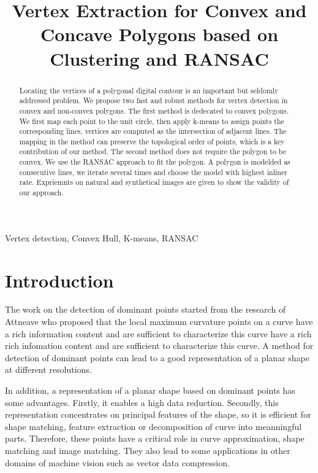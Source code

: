 \documentclass{article}
\title{Vertex Extraction for Convex and Concave Polygons based on Clustering and RANSAC}
\begin{document}
%
\maketitle
%
\begin{abstract}

Locating the vertices of a polygonal digital contour is an important but seldomly addressed problem.
We propose two fast and robust methods for vertex detection in convex and non-convex polygons.
The first method is dedecated to convex polygons. We first map each point to the unit circle, then apply
k-means to assign points the corresponding lines, vertices are computed as the intersection of adjacent lines.
The mapping in the method can preserve the topological order of points, which is a key contribution of our method.
The second method does not require the polygon to be convex. We use the RANSAC approach to fit the polygon. A polygon
is modelded as consecutive lines, we iterate several times and choose the model with highest inliner rate. Expriemnts
on natural and synthetical images are given to show the validity of our approach.

\end{abstract}
%
\begin{keywords}
  Vertex detection, Convex Hull, K-means, RANSAC
\end{keywords}
%
\section{Introduction}
\label{sec:intro}
The work on the detection of dominant points started from the research of Attneave who proposed that the local maximum
curvature points on a curve have a rich information content and are sufficient to characterize this curve have a rich
rich infomation content and are sufficient to characterize this curve. A method for detection of
dominant points can lead to a good representation of a planar shape at different resolutions.

In addition, a representation of a planar shape based on dominant points has some advantages.
Firstly, it enables a high data reduction.
Secondly, this representation concentrates on principal features of the shape, so it is
efficient for shape matching, feature extraction or decomposition of curve into meanningful parts.
Therefore, these points have a critical role in curve approximation, shape matching and image matching.
They also lead to some applications in other domains of machine vision such as vector data compression.
\end{document}
